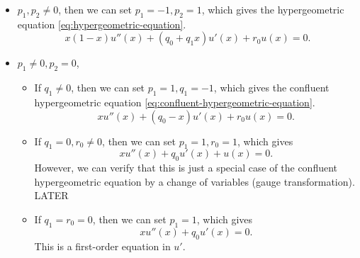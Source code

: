 \documentclass[../main.tex]{subfiles}
\begin{document}
\begin{itemize}
	\item $p_1,p_2\neq 0$, then we can set $p_1=-1, p_2=1$, which gives the hypergeometric equation \eqref{eq:hypergeometric-equation}.
		\begin{equation}
			x(1-x) u''(x) + (q_0 + q_1 x) u'(x) + r_0 u(x) = 0.
		\end{equation}
	\item $p_1 \neq 0, p_2=0$, 
		\begin{itemize}
			\item If $q_1\neq 0$, then we can set $p_1=1, q_1=-1$, which gives the confluent hypergeometric equation \eqref{eq:confluent-hypergeometric-equation}.
			\begin{equation}
				x u''(x) + (q_0 - x) u'(x) + r_0 u(x) = 0.
			\end{equation}
		\item If $q_1=0, r_0 \neq 0$, then we can set $p_1=1, r_0=1$, which gives
			\begin{equation}\label{eq:degenerate-confluent-hypergeometric-equation}
				x u''(x) + q_0 u'(x) + u(x) = 0.
			\end{equation}
			However, we can verify that this is just a special case of the confluent hypergeometric equation by a change of variables (gauge transformation). LATER
		\item If $q_1=r_0=0$, then we can set $p_1=1$, which gives
			\begin{equation}
				x u''(x) + q_0 u'(x) = 0.
			\end{equation}
			This is a first-order equation in $u'$.
		\end{itemize}
\end{itemize}
\end{document}
